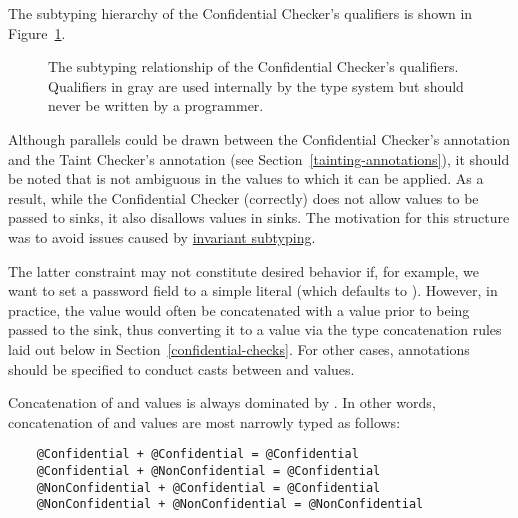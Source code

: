 The subtyping hierarchy of the Confidential Checker's qualifiers is shown in
Figure~\ref{fig-confidential-hierarchy}.

\begin{figure}
\caption{The subtyping relationship of the Confidential Checker's qualifiers.
  Qualifiers in gray are used internally by the type system but should never
  be written by a programmer.}
\label{fig-confidential-hierarchy}
\end{figure}

Although parallels could be drawn between the Confidential Checker's
 annotation and the Taint Checker's 
annotation (see Section~\ref{tainting-annotations}), it should be noted that
 is not ambiguous in the values to which it can be applied.
As a result, while the Confidential Checker (correctly) does not allow
 values to be passed to  sinks, it also
disallows  values in  sinks. The
motivation for this structure was to avoid issues caused by
\href{https://en.wikipedia.org/wiki/Covariance_and_contravariance_(computer_science)}
{invariant subtyping}.

The latter constraint may not constitute desired behavior if, for example, we want
to set a  password field to a simple literal (which defaults
to ). However, in practice, the 
value would often be concatenated with a  value prior to
being passed to the  sink, thus converting it to a
 value via the type concatenation rules laid out below in
Section~\ref{confidential-checks}. For other cases, 
annotations should be specified to conduct casts between 
and  values.



Concatenation of  and  values is
always dominated by . In other words, concatenation of
 and  values are most narrowly typed
as follows:

\begin{Verbatim}
    @Confidential + @Confidential = @Confidential
    @Confidential + @NonConfidential = @Confidential
    @NonConfidential + @Confidential = @Confidential
    @NonConfidential + @NonConfidential = @NonConfidential
\end{Verbatim}

